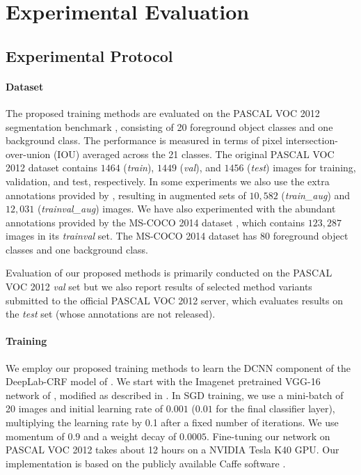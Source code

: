 \section{Experimental Evaluation}
\label{sec:experiments}

\subsection{Experimental Protocol}

\paragraph{Dataset} 
\label{sec:dataset}

The proposed training methods are evaluated on the PASCAL
VOC 2012 segmentation benchmark \citep{everingham2014pascal},
consisting of 20 foreground object classes and one background
class. The performance is measured in terms of pixel
intersection-over-union (IOU) averaged across the 21 classes. The
original PASCAL VOC 2012 dataset contains $1464$ (\textsl{train}),
$1449$ (\textsl{val}), and $1456$ (\textsl{test}) images for training,
validation, and test, respectively. In some experiments we also use
the extra annotations provided by \citet{hariharan2011semantic},
resulting in augmented sets of $10,582$ (\textsl{train\_aug}) and
$12,031$ (\textsl{trainval\_aug}) images. We have also experimented
with the abundant annotations provided by the MS-COCO 2014 dataset
\citep{lin2014microsoft}, which contains $123,287$ images in its
\textsl{trainval} set. The MS-COCO 2014 dataset has $80$ foreground
object classes and one background class.

Evaluation of our proposed methods is primarily conducted on the
PASCAL VOC 2012 \textsl{val} set but we also report results of selected
method variants submitted to the official PASCAL VOC 2012 server, which
evaluates results on the \textsl{test} set (whose annotations are not
released).

\paragraph{Training}

We employ our proposed training methods to learn the DCNN component of
the DeepLab-CRF model of \citet{chen2014semantic}. We start with the
Imagenet pretrained VGG-16 network of \citet{simonyan2014very},
modified as described in \citet{chen2014semantic}. In SGD training, we
use a mini-batch of 20 images and initial learning rate of $0.001$
($0.01$ for the final classifier layer), multiplying the learning rate
by 0.1 after a fixed number of iterations. We use momentum of $0.9$
and a weight decay of $0.0005$. Fine-tuning our network on PASCAL VOC
2012 takes about 12 hours on a NVIDIA Tesla K40 GPU. Our
implementation is based on the publicly available Caffe software
\citep{jia2014caffe}.

